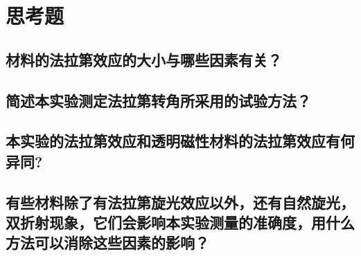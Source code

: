 \documentclass[a4paper]{article}
\begin{document}
\section{思考题}
\subsection{材料的法拉第效应的大小与哪些因素有关？}
\subsection{简述本实验测定法拉第转角所采用的试验方法？}
\subsection{本实验的法拉第效应和透明磁性材料的法拉第效应有何异同?}
\subsection{有些材料除了有法拉第旋光效应以外，还有自然旋光，双折射现象，它们会影响本实验测量的准确度，用什么方法可以消除这些因素的影响？}

\nocite{jiaocai}

\end{document}
